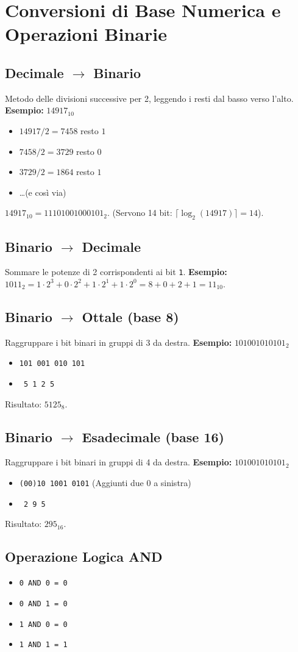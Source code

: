 \documentclass{article}
\begin{document}
\section{Conversioni di Base Numerica e Operazioni Binarie}

\subsection{Decimale $\rightarrow$ Binario}
Metodo delle divisioni successive per 2, leggendo i resti dal basso verso l'alto.
\textbf{Esempio:} $14917_{10}$
\begin{itemize}
    \item $14917 / 2 = 7458$ resto $1$
    \item $7458 / 2 = 3729$ resto $0$
    \item $3729 / 2 = 1864$ resto $1$
    \item \dots (e così via)
\end{itemize}
$14917_{10} = 11101001000101_2$. (Servono 14 bit: $\lceil \log_2(14917) \rceil = 14$).

\subsection{Binario $\rightarrow$ Decimale}
Sommare le potenze di 2 corrispondenti ai bit \texttt{1}.
\textbf{Esempio:} $1011_2 = 1 \cdot 2^3 + 0 \cdot 2^2 + 1 \cdot 2^1 + 1 \cdot 2^0 = 8 + 0 + 2 + 1 = 11_{10}$.

\subsection{Binario $\rightarrow$ Ottale (base 8)}
Raggruppare i bit binari in gruppi di 3 da destra.
\textbf{Esempio:} $101001010101_2$
\begin{itemize}
    \item \texttt{101 001 010 101}
    \item \texttt{ 5   1   2   5 }
\end{itemize}
Risultato: $5125_8$.

\subsection{Binario $\rightarrow$ Esadecimale (base 16)}
Raggruppare i bit binari in gruppi di 4 da destra.
\textbf{Esempio:} $101001010101_2$
\begin{itemize}
    \item \texttt{(00)10 1001 0101} (Aggiunti due 0 a sinistra)
    \item \texttt{   2    9    5  }
\end{itemize}
Risultato: $295_{16}$.

\subsection{Operazione Logica AND}
\begin{itemize}
    \item \texttt{0 AND 0 = 0}
    \item \texttt{0 AND 1 = 0}
    \item \texttt{1 AND 0 = 0}
    \item \texttt{1 AND 1 = 1}
\end{itemize}
\end{document}
